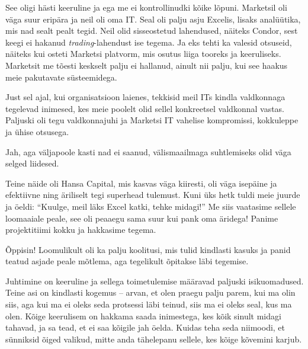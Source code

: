 
See oligi hästi keeruline ja ega me ei kontrollinudki kõike lõpuni. 
Marketsil oli väga suur eripära ja neil oli oma IT. 
Seal oli palju asju Excelis, lisaks analüütika, mis nad sealt pealt tegid. Neil olid sisseostetud lahendused, näiteks Condor, sest keegi ei hakanud 
\emph{trading}-lahendust ise tegema. Ja eks tehti
ka valesid otsuseid, näiteks kui osteti Marketsi platvorm, mis 
osutus liiga tooreks ja keeruliseks. Marketsit me tõesti keskselt palju 
ei hallanud, ainult nii palju, kui see haakus meie pakutavate 
süsteemidega. 


Just sel ajal, kui organisatsioon laienes, tekkisid meil ITs kindla
valdkonnaga tegelevad inimesed, kes meie poolelt olid sellel konkreetsel 
valdkonnal vastas. Paljuski oli tegu valdkonnajuhi ja Marketsi IT 
vahelise kompromissi, kokkuleppe ja ühise otsusega. 


Jah, aga väljapoole kasti nad ei saanud, välismaailmaga suhtlemiseks olid väga 
selged liidesed. 

Teine näide oli Hansa Capital, mis 
kasvas väga kiiresti, oli väga isepäine ja efektiivne ning äriliselt tegi superhead tulemust. Kuni üks hetk tuldi meie juurde ja öeldi: \enquote{Kuulge, 
meil läks Excel katki, tehke midagi!} Me siis vaatasime sellele loomaaiale 
peale, see oli peaaegu sama suur kui pank oma äridega! Panime projektitiimi kokku ja hakkasime tegema. 


Õppisin! Loomulikult oli ka palju koolitusi, mis tulid kindlasti kasuks ja panid 
teatud asjade peale mõtlema, aga tegelikult õpitakse läbi tegemise. 

Juhtimine on keeruline ja sellega toimetulemise määravad paljuski isikuomadused. Teine asi on kindlasti kogemus -- arvan, et 
olen praegu palju parem, kui ma olin siis, aga kui ma ei oleks seda 
protsessi läbi teinud, siis ma ei oleks seal, kus ma olen. Kõige keerulisem on 
hakkama saada inimestega, kes kõik sinult midagi tahavad, ja sa tead, et ei saa kõigile jah öelda. Kuidas 
teha seda niimoodi, et sünniksid õiged valikud, mitte anda
tähelepanu sellele, kes kõige kõvemini karjub. 

